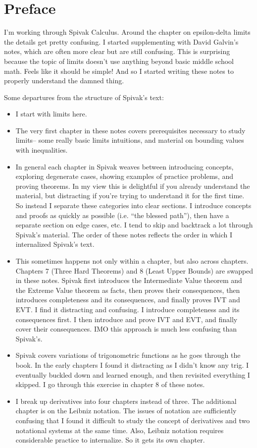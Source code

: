 
\section{Preface}

I'm working through Spivak Calculus. Around the chapter on
epsilon-delta limits the details get pretty confusing. I started
supplementing with David Galvin's notes, which are often more clear
but are still confusing. This is surprising because the topic of
limits doesn't use anything beyond basic middle school math. Feels
like it should be simple! And so I started writing these notes to
properly understand the damned thing.

\vs

Some departures from the structure of Spivak's text:
\begin{itemize}
\item I start with limits here.
\item The very first chapter in these notes covers prerequisites
  necessary to study limits-- some really basic limits intuitions, and
  material on bounding values with inequalities.
\item In general each chapter in Spivak weaves between introducing
  concepts, exploring degenerate cases, showing examples of practice
  problems, and proving theorems. In my view this is delightful if you
  already understand the material, but distracting if you're trying to
  understand it for the first time. So instead I separate these
  categories into clear sections. I introduce concepts and proofs as
  quickly as possible (i.e. ``the blessed path''), then have a
  separate section on edge cases, etc. I tend to skip and backtrack a
  lot through Spivak's material. The order of these notes reflects the
  order in which I internalized Spivak's text.
\item This sometimes happens not only within a chapter, but also
  across chapters. Chapters 7 (Three Hard Theorems) and 8 (Least Upper
  Bounds) are swapped in these notes. Spivak first introduces the
  Intermediate Value theorem and the Extreme Value theorem as facts,
  then proves their consequences, then introduces completeness and its
  consequences, and finally proves IVT and EVT. I find it distracting
  and confusing. I introduce completeness and its consequences first.
  I then introduce and prove IVT and EVT, and finally cover their
  consequences. IMO this approach is much less confusing than
  Spivak's.
\item Spivak covers variations of trigonometric functions as he goes
  through the book. In the early chapters I found it distracting as I
  didn't know any trig. I eventually buckled down and learned enough,
  and then revisited everything I skipped. I go through this exercise
  in chapter 8 of these notes.
\item I break up derivatives into four chapters instead of three. The
  additional chapter is on the Leibniz notation. The issues of
  notation are sufficiently confusing that I found it difficult to
  study the concept of derivatives and two notational systems at the
  same time. Also, Leibniz notation requires considerable practice to
  internalize. So it gets its own chapter.
\end{itemize}


